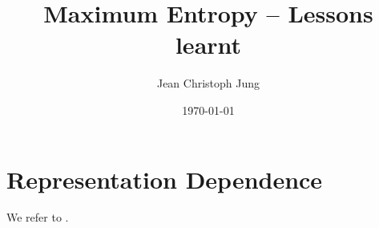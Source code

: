 \documentclass[a4wide]{article}
\title{Maximum Entropy -- Lessons learnt}
\date{\today}
\author{Jean Christoph Jung}
\begin{document}
\maketitle

\section{Representation Dependence}
We refer to \cite{DBLP:journals/jair/HalpernK04}.



\end{document}
